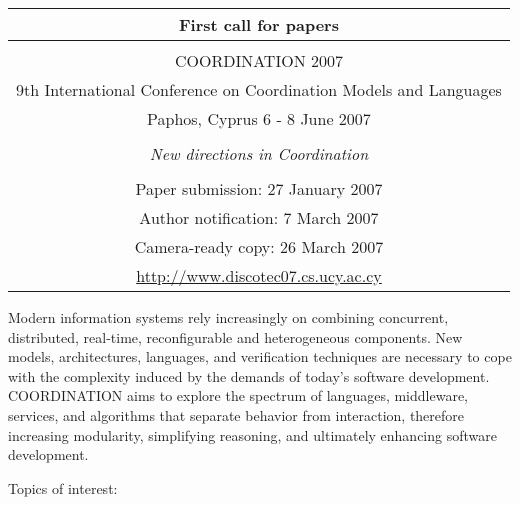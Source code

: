 \documentclass[11pt]{article}
\begin{document}
\begin{center}
\begin{tabular}{|c|} \hline
First call for papers \\
\hline
\\ 
{\Large COORDINATION 2007} \\
9th International Conference on Coordination Models and Languages \\
Paphos, Cyprus 6 - 8 June 2007 \\
\\
\emph{New directions in Coordination} \\
\\ \hline
                Paper submission: 27 January 2007 \\
                Author notification: 7 March 2007 \\
                Camera-ready copy: 26 March 2007 \\ \hline
               \url{http://www.discotec07.cs.ucy.ac.cy} \\ \hline
\end{tabular}
\end{center}

\vspace*{.5in}

\noindent
Modern information systems rely increasingly on combining concurrent,
distributed, real-time, reconfigurable and heterogeneous components.
New models, architectures, languages, and verification techniques are
necessary to cope with the complexity induced by the demands of
today's software development.  COORDINATION aims to explore the
spectrum of languages, middleware, services, and algorithms that
separate behavior from interaction, therefore increasing modularity,
simplifying reasoning, and ultimately enhancing software development.

\vspace*{.1in}
\noindent
Topics of interest:
\end{document}
